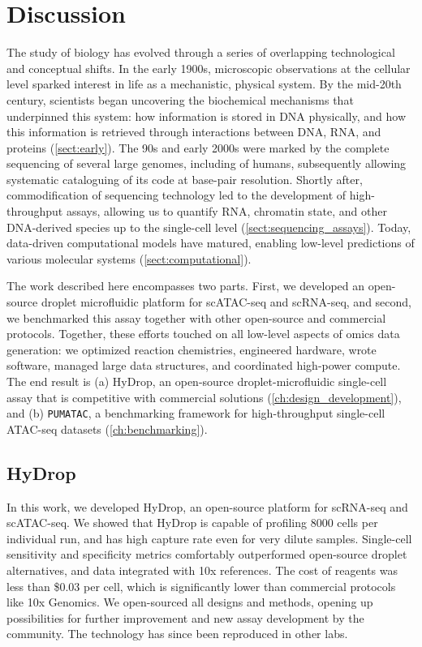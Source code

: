 \chapter{Discussion}
The study of biology has evolved through a series of overlapping technological and conceptual shifts. In the early 1900s, microscopic observations at the cellular level sparked interest in life as a mechanistic, physical system. By the mid-20th century, scientists began uncovering the biochemical mechanisms that underpinned this system: how information is stored in DNA physically, and how this information is retrieved through interactions between DNA, RNA, and proteins (\autoref{sect:early}). The 90s and early 2000s were marked by the complete sequencing of several large genomes, including of humans, subsequently allowing systematic cataloguing of its code at base-pair resolution. Shortly after, commodification of sequencing technology led to the development of high-throughput assays, allowing us to quantify RNA, chromatin state, and other DNA-derived species up to the single-cell level (\autoref{sect:sequencing_assays}). Today, data-driven computational models have matured, enabling low-level predictions of various molecular systems (\autoref{sect:computational}).

The work described here encompasses two parts. First, we developed an open-source droplet microfluidic platform for scATAC-seq and scRNA-seq, and second, we benchmarked this assay together with other open-source and commercial protocols. Together, these efforts touched on all low-level aspects of omics data generation: we optimized reaction chemistries, engineered hardware, wrote software, managed large data structures, and coordinated high-power compute. The end result is (a) HyDrop, an open-source droplet-microfluidic single-cell assay that is competitive with commercial solutions (\autoref{ch:design_development}), and (b) \verb|PUMATAC|, a benchmarking framework for high-throughput single-cell ATAC-seq datasets (\autoref{ch:benchmarking}).

\section{HyDrop}
In this work, we developed HyDrop, an open-source platform for scRNA-seq and scATAC-seq. We showed that HyDrop is capable of profiling 8000 cells per individual run, and has high capture rate even for very dilute samples. Single-cell sensitivity and specificity metrics comfortably outperformed open-source droplet alternatives, and data integrated with 10x references. The cost of reagents was less than \$0.03 per cell, which is significantly lower than commercial protocols like 10x Genomics. We open-sourced all designs and methods, opening up possibilities for further improvement and new assay development by the community. The technology has since been reproduced in other labs.

